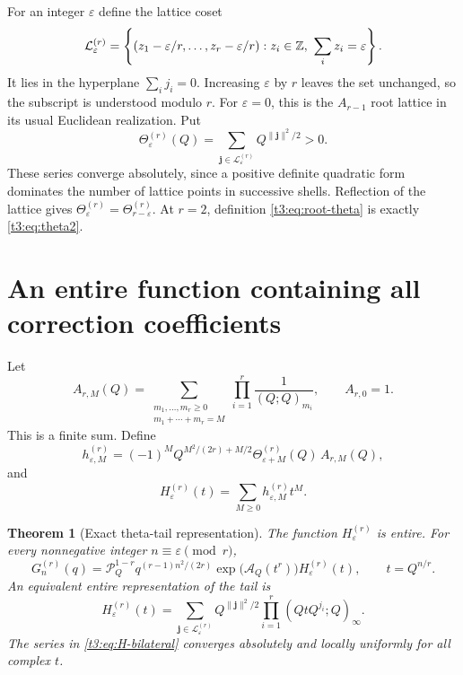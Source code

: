 \documentclass[11pt,openany]{book}
\numberwithin{equation}{chapter}
\theoremstyle{plain}
\newtheorem{theorem}{Theorem}[chapter]
\theoremstyle{definition}
\theoremstyle{remark}
\newcommand{\pp}[1]{(Q;Q)_{#1}}
\newcommand{\Pinf}{\mathcal P_Q}
\newcommand{\A}{\mathcal A_Q}
\newcommand{\eps}{\varepsilon}
\newcommand{\T}{\Theta}
\begin{document}
For an integer $\eps$ define the lattice coset
\begin{equation}\label{t3:eq:Lattice}
 \mathcal L_{\eps}^{(r)}=
 \left\{(z_1-\eps/r,\ldots,z_r-\eps/r):
 z_i\in\Z,\ \sum_i z_i=\eps\right\}.
\end{equation}
It lies in the hyperplane $\sum_i j_i=0$. Increasing $\eps$ by $r$ leaves the set unchanged, so the subscript is understood modulo $r$. For $\eps=0$, this is the $A_{r-1}$ root lattice in its usual Euclidean realization. Put
\begin{equation}\label{t3:eq:root-theta}
 \T_{\eps}^{(r)}(Q)=
 \sum_{\boldsymbol j\in\mathcal L_{\eps}^{(r)}}
 Q^{\|\boldsymbol j\|^2/2}>0.
\end{equation}
These series converge absolutely, since a positive definite quadratic form dominates the number of lattice points in successive shells. Reflection of the lattice gives
$\T_{\eps}^{(r)}=\T_{r-\eps}^{(r)}$. At $r=2$, definition \eqref{t3:eq:root-theta} is exactly \eqref{t3:eq:theta2}.

\section{An entire function containing all correction coefficients}

Let
\begin{equation}\label{t3:eq:comp-coeff}
 A_{r,M}(Q)=
 \sum_{\substack{m_1,\ldots,m_r\ge0\\m_1+\cdots+m_r=M}}
 \prod_{i=1}^r\frac1{\pp{m_i}},\qquad A_{r,0}=1.
\end{equation}
This is a finite sum. Define
\begin{equation}\label{t3:eq:h-coeff}
 h_{\eps,M}^{(r)}=
 (-1)^M Q^{M^2/(2r)+M/2}\T_{\eps+M}^{(r)}(Q)\,A_{r,M}(Q),
\end{equation}
and
\begin{equation}\label{t3:eq:H-entire}
 H_{\eps}^{(r)}(t)=\sum_{M\ge0}h_{\eps,M}^{(r)}t^M.
\end{equation}

\begin{theorem}[Exact theta-tail representation]\label{t3:thm:theta-tail}
The function $H_{\eps}^{(r)}$ is entire. For every nonnegative integer $n\equiv\eps\pmod r$,
\begin{equation}\label{t3:eq:Galois-exact}
 \boxed{\displaystyle
 G_n^{(r)}(q)=\Pinf^{1-r}
 q^{(r-1)n^2/(2r)}
 \exp\!\bigl(\A(t^r)\bigr)H_{\eps}^{(r)}(t),
 \qquad t=Q^{n/r}.}
\end{equation}
An equivalent entire representation of the tail is
\begin{equation}\label{t3:eq:H-bilateral}
 H_{\eps}^{(r)}(t)=
 \sum_{\boldsymbol j\in\mathcal L_{\eps}^{(r)}}
 Q^{\|\boldsymbol j\|^2/2}
 \prod_{i=1}^r(QtQ^{j_i};Q)_\infty.
\end{equation}
The series in \eqref{t3:eq:H-bilateral} converges absolutely and locally uniformly for all complex $t$.
\end{theorem}
\end{document}
